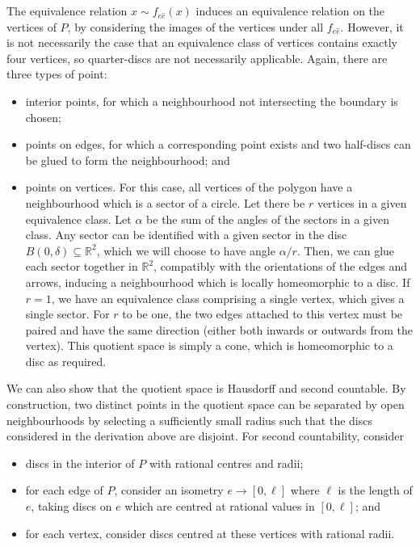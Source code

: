 \documentclass[a4paper,11pt]{article}
\begin{document}
The equivalence relation \( x \sim f_{e \hat e}(x) \) induces an equivalence relation on the vertices of \( P \), by considering the images of the vertices under all \( f_{e\hat e} \).
However, it is not necessarily the case that an equivalence class of vertices contains exactly four vertices, so quarter-discs are not necessarily applicable.
Again, there are three types of point:
\begin{itemize}
	\item interior points, for which a neighbourhood not intersecting the boundary is chosen;
	\item points on edges, for which a corresponding point exists and two half-discs can be glued to form the neighbourhood; and
	\item points on vertices.
		  For this case, all vertices of the polygon have a neighbourhood which is a sector of a circle.
		  Let there be \( r \) vertices in a given equivalence class.
		  Let \( \alpha \) be the sum of the angles of the sectors in a given class.
		  Any sector can be identified with a given sector in the disc \( B(0,\delta) \subseteq \mathbb R^2 \), which we will choose to have angle \( \alpha / r \).
		  Then, we can glue each sector together in \( \mathbb R^2 \), compatibly with the orientations of the edges and arrows, inducing a neighbourhood which is locally homeomorphic to a disc.
		  If \( r = 1 \), we have an equivalence class comprising a single vertex, which gives a single sector.
		  For \( r \) to be one, the two edges attached to this vertex must be paired and have the same direction (either both inwards or outwards from the vertex).
		  This quotient space is simply a cone, which is homeomorphic to a disc as required.
\end{itemize}
We can also show that the quotient space is Hausdorff and second countable.
By construction, two distinct points in the quotient space can be separated by open neighbourhoods by selecting a sufficiently small radius such that the discs considered in the derivation above are disjoint.
For second countability, consider
\begin{itemize}
	\item discs in the interior of \( P \) with rational centres and radii;
	\item for each edge of \( P \), consider an isometry \( e \to [0, \ell] \) where \( \ell \) is the length of \( e \), taking discs on \( e \) which are centred at rational values in \( [0,\ell] \); and
	\item for each vertex, consider discs centred at these vertices with rational radii.
\end{itemize}
\end{document}
